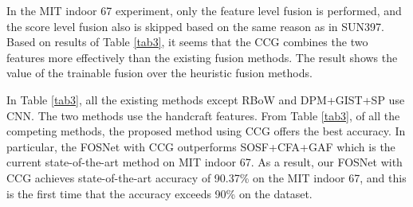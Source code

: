 \documentclass[journal,comsoc]{IEEEtran}
\begin{document}
In the MIT indoor 67 experiment, only the feature level fusion is performed, and the score level fusion also is skipped based on the same reason as in SUN397. Based on results of Table \ref{tab3}, it seems that the CCG combines the two features more effectively than the existing fusion methods. The result shows the value of the trainable fusion over the heuristic fusion methods.

In Table \ref{tab3}, all the existing methods except RBoW \cite{b1} and DPM+GIST+SP \cite{b2} use CNN. The two methods use the handcraft features. From Table \ref{tab3}, of all the competing methods, the proposed method using CCG offers the best accuracy. In particular, the FOSNet with CCG outperforms SOSF+CFA+GAF \cite{b4} which is the current state-of-the-art method on MIT indoor 67. As a result, our FOSNet with CCG achieves state-of-the-art accuracy of 90.37\% on the MIT indoor 67, and this is the first time that the accuracy exceeds 90\% on the dataset.
\end{document}
